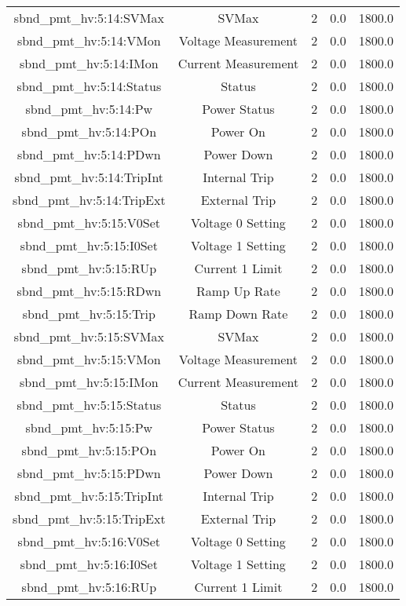 \begin{table}[ptb]
\begin{tabular}{c | c c c c}
sbnd_pmt_hv:5:14:SVMax & SVMax & 2 & 0.0 & 1800.0\\ 
sbnd_pmt_hv:5:14:VMon & Voltage Measurement & 2 & 0.0 & 1800.0\\ 
sbnd_pmt_hv:5:14:IMon & Current Measurement & 2 & 0.0 & 1800.0\\ 
sbnd_pmt_hv:5:14:Status & Status & 2 & 0.0 & 1800.0\\ 
sbnd_pmt_hv:5:14:Pw & Power Status & 2 & 0.0 & 1800.0\\ 
sbnd_pmt_hv:5:14:POn & Power On & 2 & 0.0 & 1800.0\\ 
sbnd_pmt_hv:5:14:PDwn & Power Down & 2 & 0.0 & 1800.0\\ 
sbnd_pmt_hv:5:14:TripInt & Internal Trip & 2 & 0.0 & 1800.0\\ 
sbnd_pmt_hv:5:14:TripExt & External Trip & 2 & 0.0 & 1800.0\\ 
sbnd_pmt_hv:5:15:V0Set & Voltage 0 Setting & 2 & 0.0 & 1800.0\\ 
sbnd_pmt_hv:5:15:I0Set & Voltage 1 Setting & 2 & 0.0 & 1800.0\\ 
sbnd_pmt_hv:5:15:RUp & Current 1 Limit & 2 & 0.0 & 1800.0\\ 
sbnd_pmt_hv:5:15:RDwn & Ramp Up Rate & 2 & 0.0 & 1800.0\\ 
sbnd_pmt_hv:5:15:Trip & Ramp Down Rate & 2 & 0.0 & 1800.0\\ 
sbnd_pmt_hv:5:15:SVMax & SVMax & 2 & 0.0 & 1800.0\\ 
sbnd_pmt_hv:5:15:VMon & Voltage Measurement & 2 & 0.0 & 1800.0\\ 
sbnd_pmt_hv:5:15:IMon & Current Measurement & 2 & 0.0 & 1800.0\\ 
sbnd_pmt_hv:5:15:Status & Status & 2 & 0.0 & 1800.0\\ 
sbnd_pmt_hv:5:15:Pw & Power Status & 2 & 0.0 & 1800.0\\ 
sbnd_pmt_hv:5:15:POn & Power On & 2 & 0.0 & 1800.0\\ 
sbnd_pmt_hv:5:15:PDwn & Power Down & 2 & 0.0 & 1800.0\\ 
sbnd_pmt_hv:5:15:TripInt & Internal Trip & 2 & 0.0 & 1800.0\\ 
sbnd_pmt_hv:5:15:TripExt & External Trip & 2 & 0.0 & 1800.0\\ 
sbnd_pmt_hv:5:16:V0Set & Voltage 0 Setting & 2 & 0.0 & 1800.0\\ 
sbnd_pmt_hv:5:16:I0Set & Voltage 1 Setting & 2 & 0.0 & 1800.0\\ 
sbnd_pmt_hv:5:16:RUp & Current 1 Limit & 2 & 0.0 & 1800.0\\ 

\end{tabular}
\end{table}
